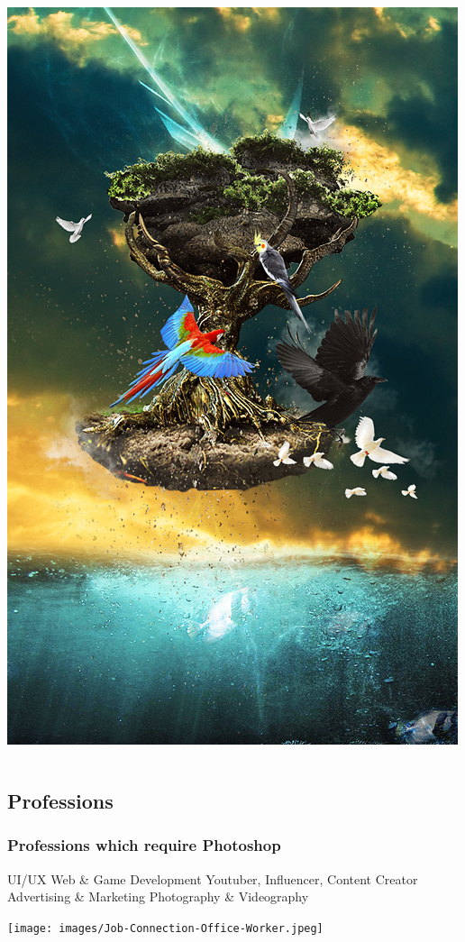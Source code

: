 \documentclass{beamer}
\begin{document}
\begin{frame}
\begin{columns}
\begin{center}
							\includegraphics[width=1.0\textwidth]{images/001+Photoshop+Tutorials.jpg}
						\end{center}
					\end{columns}
				\end{frame}

			
		\subsection{Professions}		
			\begin{frame}
				\frametitle{Professions which require Photoshop}
				\begin{outline}
					\1 UI/UX
					\1 Web \& Game Development
					\1 Youtuber, Influencer, Content Creator
					\1 Advertising \& Marketing
					\1 Photography \& Videography
				\end{outline}
			\begin{center}
				\texttt{[image: images/Job-Connection-Office-Worker.jpeg]}
			\end{center}
			\end{frame}
		
\end{document}
